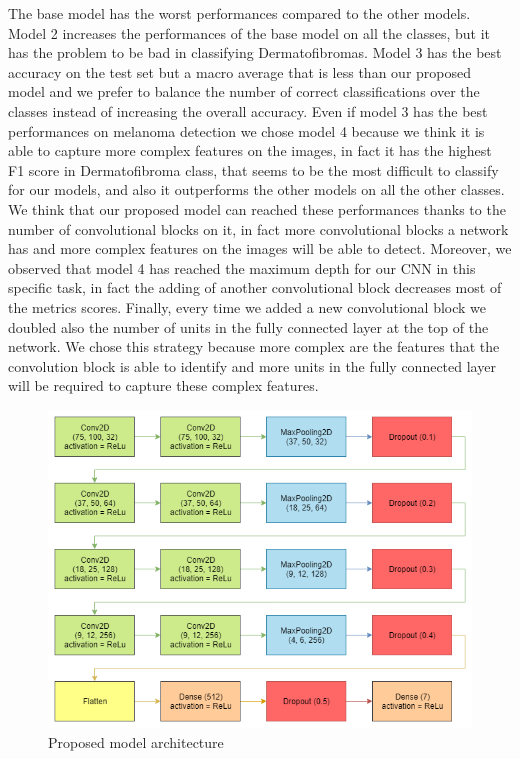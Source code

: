 		The base model has the worst performances compared to the other models. Model 2 increases the performances of the base model on all the classes, but it has the problem to be bad in classifying Dermatofibromas.
		Model 3 has the best accuracy on the test set but a macro average that is less than our proposed model and we prefer to balance the number of correct classifications over the classes instead of increasing the overall accuracy. 
		Even if model 3 has the best performances on melanoma detection we chose model 4 because we think it is able to capture more complex features on the images, in fact it has the highest F1 score in Dermatofibroma class, that seems to be the most difficult to classify for our models, and also it outperforms the other models on all the other classes. We think that our proposed model can reached these performances thanks to the number of convolutional blocks on it, in fact more convolutional blocks a network has and more complex features on the images will be able to detect. Moreover, we observed that model 4 has reached the maximum depth for our CNN in this specific task, in fact the adding of another convolutional block decreases most of the metrics scores.
		Finally, every time we added a new convolutional block we doubled also the number of units in the fully connected layer at the top of the network. We chose this strategy because more complex are the features that the convolution block is able to identify and more units in the fully connected layer will be required to capture these complex features.
		
		\begin{figure}[H]
			\centering
			\includegraphics[width=15cm]{images/proposed_model.png}
			\caption{Proposed model architecture}
			\label{fig:proposed_model}
		\end{figure}
		

